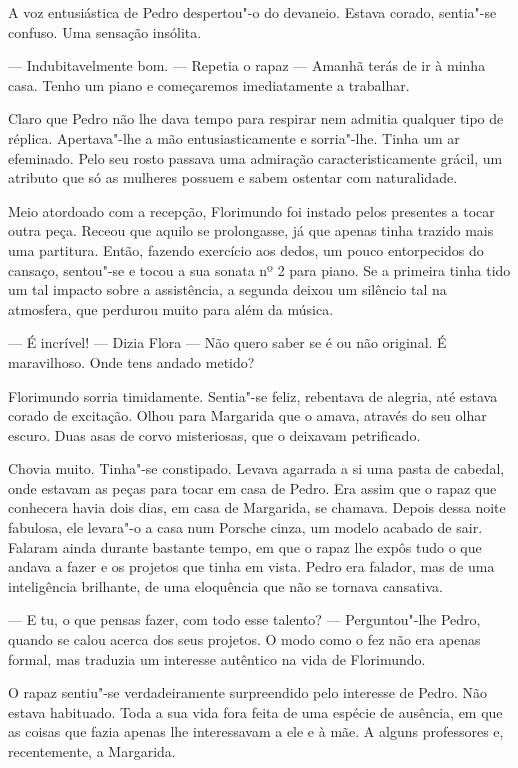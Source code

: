 A voz entusiástica de Pedro despertou"-o do devaneio. Estava corado,
sentia"-se confuso. Uma sensação insólita.

--- Indubitavelmente bom. --- Repetia o rapaz --- Amanhã terás de ir à minha
casa. Tenho um piano e começaremos imediatamente a trabalhar.

Claro que Pedro não lhe dava tempo para respirar nem admitia qualquer
tipo de réplica. Apertava"-lhe a mão entusiasticamente e sorria"-lhe.
Tinha um ar efeminado. Pelo seu rosto passava uma admiração
caracteristicamente grácil, um atributo que só as mulheres possuem e
sabem ostentar com naturalidade.

Meio atordoado com a recepção, Florimundo foi instado pelos presentes a
tocar outra peça. Receou que aquilo se prolongasse, já que apenas tinha
trazido mais uma partitura. Então, fazendo exercício aos dedos, um pouco
entorpecidos do cansaço, sentou"-se e tocou a sua sonata nº 2 para piano.
Se a primeira tinha tido um tal impacto sobre a assistência, a segunda
deixou um silêncio tal na atmosfera, que perdurou muito para além da
música.

--- É incrível! --- Dizia Flora --- Não quero saber se é ou não original. É
maravilhoso. Onde tens andado metido?

Florimundo sorria timidamente. Sentia"-se feliz, rebentava de alegria,
até estava corado de excitação. Olhou para Margarida que o amava,
através do seu olhar escuro. Duas asas de corvo misteriosas, que o
deixavam petrificado.

Chovia muito. Tinha"-se constipado. Levava agarrada a si uma pasta de
cabedal, onde estavam as peças para tocar em casa de Pedro. Era assim
que o rapaz que conhecera havia dois dias, em casa de Margarida, se
chamava. Depois dessa noite fabulosa, ele levara"-o a casa num Porsche
cinza, um modelo acabado de sair. Falaram ainda durante bastante tempo,
em que o rapaz lhe expôs tudo o que andava a fazer e os projetos que
tinha em vista. Pedro era falador, mas de uma inteligência brilhante, de
uma eloquência que não se tornava cansativa.

--- E tu, o que pensas fazer, com todo esse talento? --- Perguntou"-lhe
Pedro, quando se calou acerca dos seus projetos. O modo como o fez não
era apenas formal, mas traduzia um interesse autêntico na vida de
Florimundo.

O rapaz sentiu"-se verdadeiramente surpreendido pelo interesse de Pedro.
Não estava habituado. Toda a sua vida fora feita de uma espécie de
ausência, em que as coisas que fazia apenas lhe interessavam a ele e à
mãe. A alguns professores e, recentemente, a Margarida.


